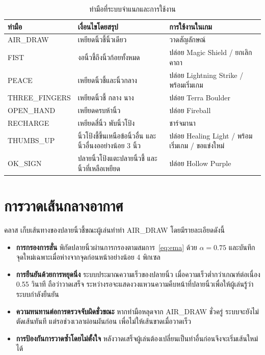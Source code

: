 \documentclass[12pt,a4paper]{report}
\newcommand{\code}[1]{\texttt{\detokenize{#1}}}
\begin{document}
\begin{table}[H]
  \centering
  \caption{ท่ามือที่ระบบจำแนกและการใช้งาน}
  \label{tab:gestures}
  \small
  \begin{tabularx}{\textwidth}{l Y Y}
    \toprule
    \textbf{ท่ามือ} & \textbf{เงื่อนไขโดยสรุป} & \textbf{การใช้งานในเกม} \\
    \midrule
    AIR\_DRAW & เหยียดนิ้วชี้นิ้วเดียว & วาดสัญลักษณ์ \\
    FIST & งอนิ้วชี้ถึงนิ้วก้อยทั้งหมด & ปล่อย Magic Shield / ยกเลิกคาถา \\
    PEACE & เหยียดนิ้วชี้และนิ้วกลาง & ปล่อย Lightning Strike / พร้อมเริ่มเกม \\
    THREE\_FINGERS & เหยียดนิ้วชี้ กลาง นาง & ปล่อย Terra Boulder \\
    OPEN\_HAND & เหยียดครบห้านิ้ว & ปล่อย Fireball \\
    RECHARGE & เหยียดสี่นิ้ว พับนิ้วโป้ง & ชาร์จมานา \\
    THUMBS\_UP & นิ้วโป้งชี้ขึ้นเหนือข้อนิ้วอื่น และนิ้วอื่นงออย่างน้อย 3 นิ้ว & ปล่อย Healing Light / พร้อมเริ่มเกม / ขอแข่งใหม่ \\
    OK\_SIGN & ปลายนิ้วโป้งแตะปลายนิ้วชี้ และนิ้วที่เหลือเหยียด & ปล่อย Hollow Purple \\
    \bottomrule
  \end{tabularx}
\end{table}

\section{การวาดเส้นกลางอากาศ}
คลาส \code{AirDrawSession} เก็บเส้นทางของปลายนิ้วชี้ขณะผู้เล่นทำท่า AIR\_DRAW โดยมีรายละเอียดดังนี้
\begin{itemize}[leftmargin=2cm]
  \item \textbf{การกรองการสั่น} พิกัดปลายนิ้วผ่านการกรองตามสมการ~\eqref{eq:ema} ด้วย $\alpha = 0.75$
        และบันทึกจุดใหม่เฉพาะเมื่อห่างจากจุดก่อนหน้าอย่างน้อย 4 พิกเซล
  \item \textbf{การยืนยันด้วยการหยุดนิ่ง} ระบบประมาณความเร็วของปลายนิ้ว เมื่อความเร็วต่ำกว่าเกณฑ์ต่อเนื่อง 0.55 วินาที
        ถือว่าวาดเสร็จ ระหว่างรอจะแสดงวงแหวนความคืบหน้าที่ปลายนิ้วเพื่อให้ผู้เล่นรู้ว่าระบบกำลังยืนยัน
  \item \textbf{ความทนทานต่อการตรวจจับผิดชั่วขณะ} หากท่ามือหลุดจาก AIR\_DRAW ชั่วครู่ ระบบจะยังไม่ตัดเส้นทันที
        แต่รอช่วงเวลาผ่อนผันก่อน เพื่อไม่ให้เส้นขาดเมื่อวาดเร็ว
  \item \textbf{การป้องกันการวาดซ้ำโดยไม่ตั้งใจ} หลังวาดเสร็จผู้เล่นต้องเปลี่ยนเป็นท่าอื่นก่อนจึงจะเริ่มเส้นใหม่ได้
\end{itemize}
\end{document}
